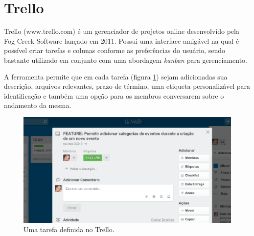 \section{Trello}
\par Trello (www.trello.com) é um gerenciador de projetos online desenvolvido pela Fog Creek Software lançado em 2011. Possui uma interface amigável na qual é possível criar tarefas e colunas conforme as preferências do usuário, sendo bastante utilizado em conjunto com uma abordagem \emph{kanban} para gerenciamento.
\par A ferramenta permite que em cada tarefa (figura \ref{fig:trello-task}) sejam adicionadas sua descrição, arquivos relevantes, prazo de término, uma etiqueta personalizável para identificação e também uma opção para os membros conversarem sobre o andamento da mesma.

\begin{figure}[htb]
\centering
\includegraphics[width=15cm]{figuras/trello-task}
\caption{\label{fig:trello-task} Uma tarefa definida no Trello.}
\end{figure}

